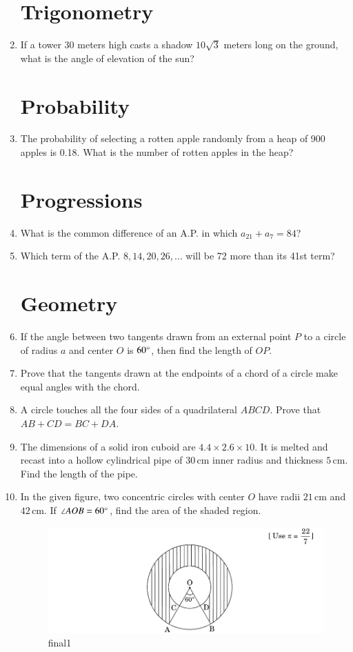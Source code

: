 \documentclass[12pt, letterpaper]{article}
\begin{document}
\begin{enumerate}
    \section*{Trigonometry}
    \item If a tower $30$ meters high casts a shadow $10\sqrt{3}$ meters long on the ground, what is the angle of elevation of the sun?

    \section*{Probability}
    \item The probability of selecting a rotten apple randomly from a heap of 900 apples is 0.18. What is the number of rotten apples in the heap?

    \section*{Progressions}
    \item What is the common difference of an A.P. in which $a_{21} + a_{7} = 84$?
    \item Which term of the A.P. $8, 14, 20, 26, \ldots$ will be 72 more than its 41st term?

    \section*{Geometry}
    \item If the angle between two tangents drawn from an external point $P$ to a circle of radius $a$ and center $O$ is $60\degree$, then find the length of $OP$.
    \item Prove that the tangents drawn at the endpoints of a chord of a circle make equal angles with the chord.
    \item A circle touches all the four sides of a quadrilateral $ABCD$. Prove that $AB + CD = BC + DA$.
    \item The dimensions of a solid iron cuboid are $4.4 \times 2.6 \times 10$. It is melted and recast into a hollow cylindrical pipe of $30\,\mathrm{cm}$ inner radius and thickness $5\,\mathrm{cm}$. Find the length of the pipe.
    \item In the given figure, two concentric circles with center $O$ have radii $21\,\mathrm{cm}$ and $42\,\mathrm{cm}$. If $\angle AOB = 60\degree$, find the area of the shaded region.

    \begin{figure}[H]
        \centering
        \includegraphics[width=\columnwidth]{final1.jpg}
	    \caption{final1}
    \end{figure}


\end{enumerate}
\end{document}
